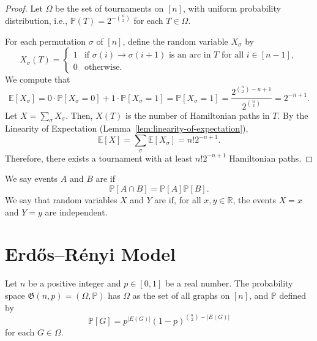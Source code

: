 \begin{proof}
    Let \(\Omega\) be the set of tournaments on \([n]\),
    with uniform probability distribution, i.e., \(\mathbb{P}(T) = 2^{-\binom{n}{2}}\) for each \(T \in \Omega\).

    For each permutation \(\sigma\) of \([n]\),
    define the random variable \(X_{\sigma}\) by
    \begin{equation}
        X_{\sigma}(T) = 
        \begin{cases}
            1 & \text{if } \sigma(i) \to \sigma(i+1) \text{ is an arc in } T \text{ for all } i \in [n-1], \\
            0 & \text{otherwise}.
        \end{cases}
    \end{equation}
    We compute that
    \begin{equation}
        \mathbb{E}[X_{\sigma}] = 0 \cdot \mathbb{P}[X_{\sigma} = 0] + 1 \cdot \mathbb{P}[X_{\sigma} = 1] = \mathbb{P}[X_{\sigma} = 1] = 
        \frac{2^{\binom{n}{2} - n + 1}}{2^{\binom{n}{2}}} = 2^{-n+1}.
    \end{equation}
    Let \(X = \sum_{\sigma} X_{\sigma}\).
    Then, \(X(T)\) is the number of Hamiltonian paths in \(T\).
    By the Linearity of Expectation (Lemma~\ref{lem:linearity-of-expectation}),
    \begin{equation}
        \mathbb{E}[X] = \sum_{\sigma} \mathbb{E}[X_{\sigma}] = {n!} 2^{-n+1}.
    \end{equation}
    Therefore, there exists a tournament with at least \({n!} 2^{-n+1}\) Hamiltonian paths.
\end{proof}

We say events \(A\) and \(B\) are  if
\begin{equation}
    \mathbb{P}[A \cap B] = \mathbb{P}[A] \mathbb{P}[B].
\end{equation}
We say that random variables \(X\) and \(Y\) are  if, for all \(x, y \in \mathbb{R}\), the events \(X = x\) and \(Y = y\) are independent.

\section{Erd\H{o}s--Rényi Model}

Let \(n\) be a positive integer and \(p \in [0, 1]\) be a real number.
The probability space \(\mathfrak{G}(n, p) = (\Omega, \mathbb{P})\) has \(\Omega\) as the set of all graphs on \([n]\),
and \(\mathbb{P}\) defined by
\begin{equation}
    \mathbb{P}[G] = p^{|E(G)|} (1-p)^{\binom{n}{2} - |E(G)|}
\end{equation}
for each \(G \in \Omega\).

